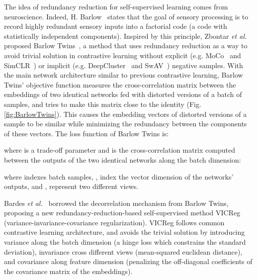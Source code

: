 \documentclass[lettersize,journal]{IEEEtran}
\newcommand{\etal}{\textit{et al.}}
\begin{document}
The idea of redundancy reduction for self-supervised learning comes from neuroscience. Indeed, H. Barlow~\cite{barlow1961possible} states that the goal of sensory processing is to record highly redundant sensory inputs into a factorial code (a code with statistically independent components). Inspired by this principle, Zbontar \etal~ proposed Barlow Twins~\cite{zbontar2021barlow}, a method that uses redundancy reduction as a way to avoid trivial solution in contrastive learning without explicit (e.g. MoCo~\cite{he2020momentum} and SimCLR~\cite{chen2020simple})  or implicit (e.g. DeepCluster~\cite{caron2018deep} and SwAV~\cite{caron2020unsupervised}) negative samples. With the main network architecture similar to previous contrastive learning, Barlow Twins’ objective function measures the cross-correlation matrix between the embeddings of two identical networks fed with distorted versions of a batch of samples, and tries to make this matrix close to the identity (Fig. \ref{fig:BarlowTwins}). This causes the embedding vectors of distorted versions of a sample to be similar while minimizing the redundancy between the components of these vectors. The loss function of Barlow Twins is:



\noindent where  is a trade-off parameter and  is the cross-correlation matrix computed between the outputs of the two identical networks along the batch dimension:



\noindent where  indexes batch samples, ,  index the vector dimension of the networks’ outputs, and ,  represent two different views.





Bardes \etal~\cite{bardes2021vicreg} borrowed the decorrelation mechanism from Barlow Twins, proposing a new redundancy-reduction-based self-supervised method VICReg (variance-invariance-covariance regularization). VICReg follows common contrastive learning architecture, and avoids the trivial solution by introducing variance along the batch dimension (a hinge loss which constrains the standard deviation), invariance cross different views (mean-squared euclidean distance), and covariance along feature dimension (penalizing the off-diagonal coefficients of the covariance matrix of the embeddings).
\end{document}
